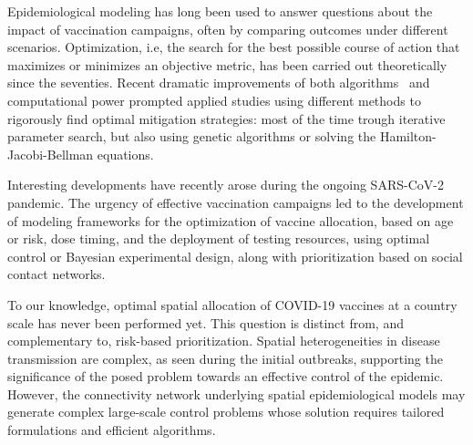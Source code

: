Epidemiological modeling has long been used to answer questions about the impact of vaccination campaigns, often by comparing outcomes under different scenarios\cite{Lee:AchievingCoordinatedNational:2020,Pasetto:RealtimeForecastingCholera:2018}. Optimization, i.e, the search for the best possible course of action that maximizes or minimizes an objective metric, has been carried out theoretically since the seventies\cite{Morton:OptimalControlDeterministic:1974,Sethi:OptimalControlSimple:1978, Greenhalgh:ResultsOptimalControl:1988}. Recent dramatic improvements of both algorithms~\cite{Quirynen:MultipleShootingMicrosecond:2015} and computational power prompted applied studies using different methods to rigorously find optimal mitigation strategies: most of the time trough iterative parameter search\cite{Sah:OptimizingImpactLowefficacy:2018, Medlock:OptimizingInfluenzaVaccine:2009}, but also using genetic algorithms\cite{Patel:FindingOptimalVaccination:2005} or solving the Hamilton-Jacobi-Bellman equations\cite{Zakary:AnalysisMultiregionsDiscrete:2017, MillerNeilan:OptimalVaccineDistribution:2011}.

Interesting developments have recently arose during the ongoing SARS-CoV-2 pandemic\cite{Fitzpatrick:OptimizingAgespecificVaccination:2021, Thul:StochasticOptimizationVaccine:2021,Moore:VaccinationNonPharmaceuticalInterventions:2021}. The urgency of effective vaccination campaigns led to the development of modeling frameworks for the optimization of vaccine allocation, based on age or risk\cite{Matrajt:VaccineOptimizationCOVID19:2020a,Spassiani:VaccinationCriteriaBased:2020,Fitzpatrick:OptimizingAgespecificVaccination:2021, Bubar:ModelinformedCOVID19Vaccine:2021}, dose timing\cite{Saad-Roy:EpidemiologicalEvolutionaryConsiderations:2021, Kadire:DelayedSecondDose:2021}, and the deployment of testing resources, using optimal control\cite{Acemoglu:OptimalAdaptiveTesting:2021} or Bayesian experimental design\cite{Chatzimanolakis:OptimalAllocationLimited:2020}, along with prioritization based on social contact networks\cite{Chen:PrioritizingAllocationCOVID19:2021}. 

To our knowledge, optimal spatial allocation of COVID-19 vaccines at a country scale has never been performed yet. This question is distinct from, and complementary to, risk-based prioritization. Spatial heterogeneities in disease transmission are complex, as seen during the initial outbreaks\cite{Gatto:SpreadDynamicsCOVID19:2020,Bertuzzo:GeographyCOVID19Spread:2020,Li:SubstantialUndocumentedInfection:2020}, supporting the significance of the posed problem towards an effective control of the epidemic. However, the connectivity network underlying spatial epidemiological models may generate complex large-scale control problems whose solution requires tailored formulations and efficient algorithms.  

